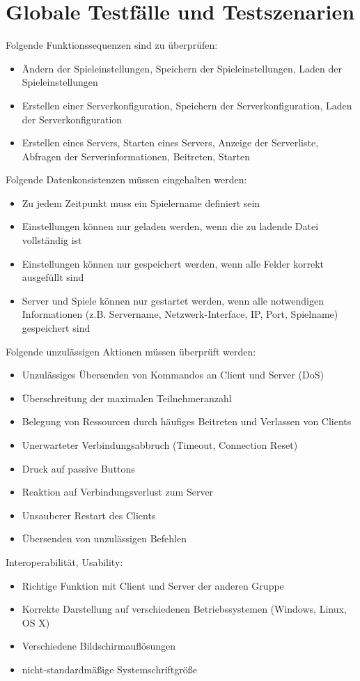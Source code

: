 \documentclass[a4paper,10pt]{article}
\begin{document}
\section{Globale Testfälle und Testszenarien}
Folgende Funktionssequenzen sind zu überprüfen:
\begin{itemize}
\item Ändern der Spieleinstellungen, Speichern der Spieleinstellungen, Laden der Spieleinstellungen
\item Erstellen einer Serverkonfiguration, Speichern der Serverkonfiguration, Laden der Serverkonfiguration
\item Erstellen eines Servers, Starten eines Servers, Anzeige der Serverliste, Abfragen der Serverinformationen, Beitreten, Starten
\end{itemize}
Folgende Datenkonsistenzen müssen eingehalten werden:
\begin{itemize}
\item Zu jedem Zeitpunkt muss ein Spielername definiert sein
\item Einstellungen können nur geladen werden, wenn die zu ladende Datei vollständig ist
\item Einstellungen können nur gespeichert werden, wenn alle Felder korrekt ausgefüllt sind
\item Server und Spiele können nur gestartet werden, wenn alle notwendigen Informationen (z.B. Servername, Netzwerk-Interface, IP, Port, Spielname) gespeichert sind
\end{itemize}
Folgende unzulässigen Aktionen müssen überprüft werden:
\begin{itemize}
\item Unzulässiges Übersenden von Kommandos an Client und Server (DoS)
\item Überschreitung der maximalen Teilnehmeranzahl
\item Belegung von Ressourcen durch häufiges Beitreten und Verlassen von Clients
\item Unerwarteter Verbindungsabbruch (Timeout, Connection Reset)
\item Druck auf passive Buttons
\item Reaktion auf Verbindungsverlust zum Server
\item Unsauberer Restart des Clients
\item Übersenden von unzulässigen Befehlen
\end{itemize}
Interoperabilität, Usability:
\begin{itemize}
\item Richtige Funktion mit Client und Server der anderen Gruppe
\item Korrekte Darstellung auf verschiedenen Betriebssystemen (Windows, Linux, OS X)
\item Verschiedene Bildschirmauflösungen
\item nicht-standardmäßige Systemschriftgröße
\end{itemize}
\end{document}
